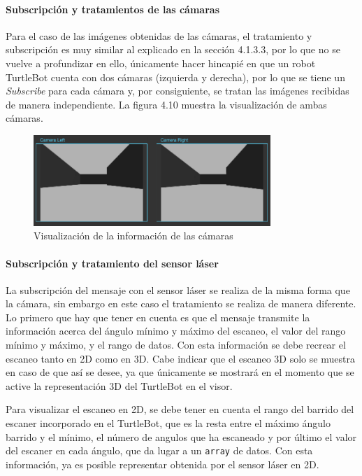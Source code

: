 \paragraph{Subscripción y tratamientos de las cámaras}

Para el caso de las imágenes obtenidas de las cámaras, el tratamiento y subscripción es muy similar al explicado en la sección 4.1.3.3, por lo que no se vuelve a profundizar en ello, únicamente hacer hincapié en que un robot TurtleBot cuenta con dos cámaras (izquierda y derecha), por lo que se tiene un \textit{Subscribe} para cada cámara y, por consiguiente, se tratan las imágenes recibidas de manera independiente. La figura 4.10 muestra la visualización de ambas cámaras.

\begin{figure}[H]
  \begin{center}
    \includegraphics[width=0.8\textwidth]{figures/camarasturtle.png}
		\caption{Visualización de la información de las cámaras}
		\label{fig.camarasturtle}
		\end{center}
\end{figure}

\paragraph{Subscripción y tratamiento del sensor láser}

La subscripción del mensaje con el sensor láser se realiza de la misma forma que la cámara, sin embargo en este caso el tratamiento se realiza de manera diferente. Lo primero que hay que tener en cuenta es que el mensaje transmite la información acerca del ángulo mínimo y máximo del escaneo, el valor del rango mínimo y máximo, y el rango de datos. Con esta información se debe recrear el escaneo tanto en 2D como en 3D. Cabe indicar que el escaneo 3D solo se muestra en caso de que así se desee, ya que únicamente se mostrará en el momento que se active la representación 3D del TurtleBot en el visor.

Para visualizar el escaneo en 2D, se debe tener en cuenta el rango del barrido del escaner incorporado en el TurtleBot, que es la resta entre el máximo ángulo barrido y el mínimo, el número de angulos que ha escaneado y por último el valor del escaner en cada ángulo, que da lugar a un \texttt{array} de datos. Con esta información, ya es posible representar obtenida por el sensor láser en 2D.


